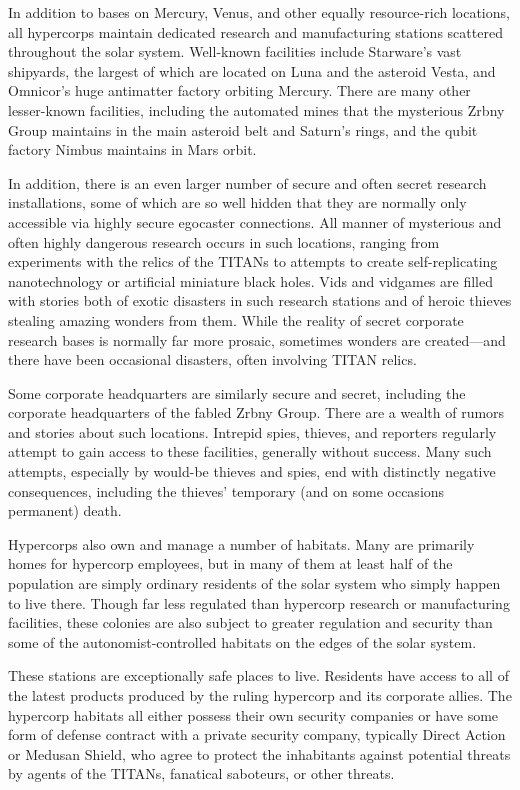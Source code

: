 In addition to bases on Mercury, Venus, and other equally
resource-rich locations, all hypercorps maintain dedicated research
and manufacturing stations scattered throughout the solar
system. Well-known facilities include Starware's vast shipyards, the
largest of which are located on Luna and the asteroid Vesta, and
Omnicor's huge antimatter factory orbiting Mercury. There are many
other lesser-known facilities, including the automated mines that the
mysterious Zrbny Group maintains in the main asteroid belt and
Saturn's rings, and the qubit factory Nimbus maintains in Mars orbit.

In addition, there is an even larger number of secure and often secret
research installations, some of which are so well hidden that they are
normally only accessible via highly secure egocaster connections. All
manner of mysterious and often highly dangerous research occurs in
such locations, ranging from experiments with the relics of the TITANs
to attempts to create self-replicating nanotechnology or artificial
miniature black holes. Vids and vidgames are filled with stories both
of exotic disasters in such research stations and of heroic thieves
stealing amazing wonders from them. While the reality of secret
corporate research bases is normally far more prosaic, sometimes
wonders are created—and there have been occasional disasters, often
involving TITAN relics.

Some corporate headquarters are similarly secure and secret, including
the corporate headquarters of the fabled Zrbny Group. There are a
wealth of rumors and stories about such locations. Intrepid spies,
thieves, and reporters regularly attempt to gain access to these
facilities, generally without success.  Many such attempts, especially
by would-be thieves and spies, end with distinctly negative
consequences, including the thieves' temporary (and on some occasions
permanent) death.

Hypercorps also own and manage a number of habitats. Many are
primarily homes for hypercorp employees, but in many of them at least
half of the population are simply ordinary residents of the solar
system who simply happen to live there. Though far less regulated than
hypercorp research or manufacturing facilities, these colonies are
also subject to greater regulation and security than some of the
autonomist-controlled habitats on the edges of the solar system.

These stations are exceptionally safe places to live.  Residents have
access to all of the latest products produced by the ruling hypercorp
and its corporate allies. The hypercorp habitats all either possess
their own security companies or have some form of defense contract
with a private security company, typically Direct Action or Medusan
Shield, who agree to protect the inhabitants against potential threats
by agents of the TITANs, fanatical saboteurs, or other threats.

